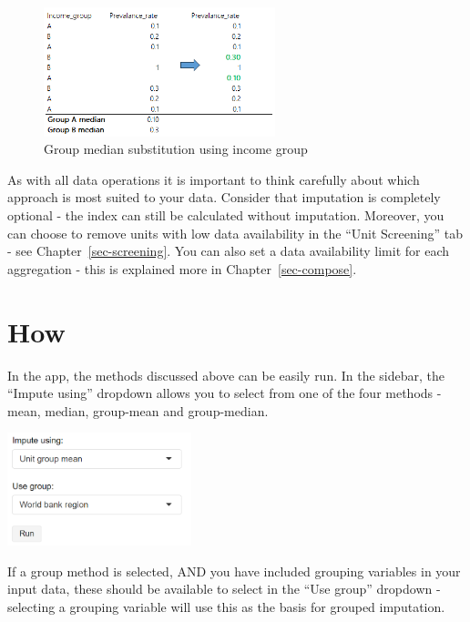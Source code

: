 \documentclass[
  letterpaper,
  DIV=11,
  numbers=noendperiod]{scrreprt}
\begin{document}
\begin{figure}

{\centering \includegraphics[width=0.6\textwidth,height=\textheight]{figs/imputation_3.png}

}

\caption{Group median substitution using income group}

\end{figure}

As with all data operations it is important to think carefully about
which approach is most suited to your data. Consider that imputation is
completely optional - the index can still be calculated without
imputation. Moreover, you can choose to remove units with low data
availability in the ``Unit Screening'' tab - see
Chapter~\ref{sec-screening}. You can also set a data availability limit
for each aggregation - this is explained more in
Chapter~\ref{sec-compose}.

\hypertarget{how-1}{%
\section{How}\label{how-1}}

In the app, the methods discussed above can be easily run. In the
sidebar, the ``Impute using'' dropdown allows you to select from one of
the four methods - mean, median, group-mean and group-median.

\includegraphics[width=0.4\textwidth,height=\textheight]{figs/imputation_1.png}

If a group method is selected, AND you have included grouping variables
in your input data, these should be available to select in the ``Use
group'' dropdown - selecting a grouping variable will use this as the
basis for grouped imputation.
\end{document}

